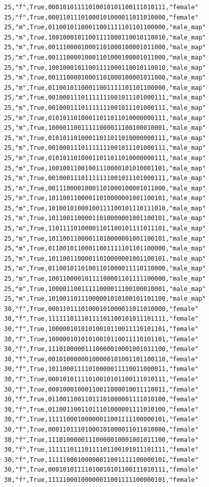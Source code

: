 \documentclass[authoryearcitations]{UoYCSproject}
\begin{document}
\begin{framed}
\begin{verbatim}
25,"f",True,00010101111010010101100111010111,"female"
25,"f",True,00011011101000101000011011010000,"female"
25,"m",True,01100101100011001111101101100000,"male_map"
25,"m",True,10010001011001111000110010110010,"male_map"
25,"m",True,00111000010001101000100001011000,"male_map"
25,"m",True,00111000010001101000100001011000,"male_map"
25,"m",True,10010001011001111000110010110010,"male_map"
25,"m",True,00111000010001101000100001011000,"male_map"
25,"m",True,01100101100011001111101101100000,"male_map"
25,"m",True,00100011101111111001011101000111,"male_map"
25,"m",True,00100011101111111001011101000111,"male_map"
25,"m",True,01010110100011011011010000000111,"male_map"
25,"m",True,10000110011111000011100100010001,"male_map"
25,"m",True,01010110100011011011010000000111,"male_map"
25,"m",True,00100011101111111001011101000111,"male_map"
25,"m",True,01010110100011011011010000000111,"male_map"
25,"m",True,10010011001001110000101010001101,"male_map"
25,"m",True,00100011101111111001011101000111,"male_map"
25,"m",True,00111000010001101000100001011000,"male_map"
25,"m",True,10110011000011010000001001100101,"male_map"
25,"m",True,10100101000100111100101110111010,"male_map"
25,"m",True,10110011000011010000001001100101,"male_map"
25,"m",True,11011110100001101100101111011101,"male_map"
25,"m",True,10110011000011010000001001100101,"male_map"
25,"m",True,01100101100011001111101101100000,"male_map"
25,"m",True,10110011000011010000001001100101,"male_map"
25,"m",True,01100101101001101000011110110000,"male_map"
25,"m",True,10011000010111100001101111100000,"male_map"
25,"m",True,10000110011111000011100100010001,"male_map"
25,"m",True,10100110111000001010100101101100,"male_map"
30,"f",True,00011011101000101000011011010000,"female"
30,"f",True,11111101110111101100101011101111,"female"
30,"f",True,10000010101010010110011110101101,"female"
30,"f",True,10000010101010010110011110101101,"female"
30,"f",True,11101000001110000010001001011100,"female"
30,"f",True,00101000000100000101001101100110,"female"
30,"f",True,10110001111010000011110011000011,"female"
30,"f",True,00010101111010010101100111010111,"female"
30,"f",True,00010001000110011000010011110011,"female"
30,"f",True,01100110011011101000001111010100,"female"
30,"f",True,01100110011011101000001111010100,"female"
30,"f",True,11111000100000011001111100000101,"female"
30,"f",True,00011011101000101000011011010000,"female"
30,"f",True,11101000001110000010001001011100,"female"
30,"f",True,11111101110111101100101011101111,"female"
30,"f",True,11111000100000011001111100000101,"female"
30,"f",True,00010101111010010101100111010111,"female"
30,"f",True,11111000100000011001111100000101,"female"

\end{verbatim}
\end{framed}
\end{document}
